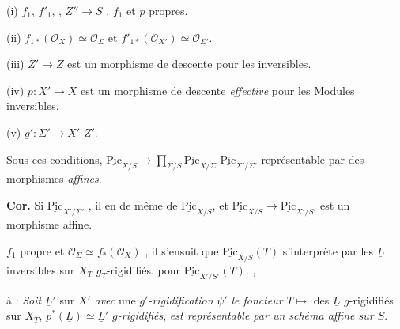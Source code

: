 \documentclass[11pt,a4paper]{article}
\begin{document}
(i) \struck{\ill{}} $f_1$, \struck{$\Sigma$} $f'_1$, \struck{$\Sigma$}
\struck{\ill{}}, $Z'' \to S$ .
\struck{[\ill{} $f, f'$, $Z'' \to S$, $Z''' \to S$]} $f_1$ et $p$ propres.

(ii) $f_{1*}(\mathcal{O}_X) \simeq \mathcal{O}_\Sigma$ et
$f'_{1*}(\mathcal{O}_{X'}) \simeq \mathcal{O}_{\Sigma'}$.


(iii) $Z' \to Z$ est un morphisme de descente
 pour les  inversibles.

(iv) $p \colon X' \to X$ est un morphisme de descente \emph{effective}
 pour les Modules inversibles.

(v)  $g' \colon \Sigma' \to X'$  
\ill{}  $Z'$.

Sous ces conditions, $\underline{\mathrm{Pic}}_{X/S} \to
\prod_{\Sigma/S} \underline{\mathrm{Pic}}_{X/\Sigma}$ \ill{} \struck{\ill{}}
$\underline{\mathrm{Pic}}_{X'/\Sigma'}$  représentable par
des morphismes \emph{affines}.

\textbf{Cor.} Si $\underline{\mathrm{Pic}}_{X'/\Sigma'}$  , il en  de même de
$\underline{\mathrm{Pic}}_{X/S}$, et $\underline{\mathrm{Pic}}_{X/S} \to
\underline{\mathrm{Pic}}_{X'/S'}$ est un morphisme affine.

 $f_1$  propre et
$\mathcal{O}_\Sigma \simeq f_*(\mathcal{O}_X)$ ,
il s'ensuit \struck{\ill{}} que $\underline{\mathrm{Pic}}_{X/S}(T)$
s'interprète par les $\underline{L}$ inversibles sur $X_T$
$g_T$-rigidifiés.  pour
$\underline{\mathrm{Pic}}_{X'/S'}(T)$.  \ill{}
    \ill{}, \ill{} \ill{}


 à  : \emph{Soit} $\underline{L}'$ sur
$X'$ \emph{avec} une \emph{$g'$-rigidification} $\psi'$
 \emph{}
\emph{le foncteur} $T \mapsto$  des $\underline{L}$
$g$-rigidifiés sur $X_T$,  $p^{*}(\underline{L}) \simeq
\underline{L}'$ \emph{ $g$-rigidifiés}, \emph{est
représentable par un schéma affine sur $S$}.
\end{document}
